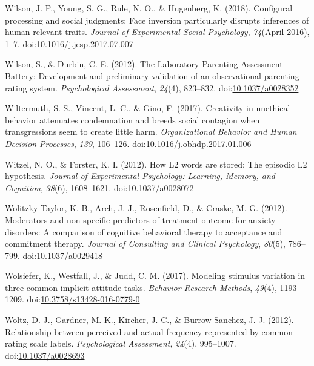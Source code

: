 \documentclass[english,man]{apa6}
\theoremstyle{definition}
\theoremstyle{definition}
\theoremstyle{definition}
\theoremstyle{remark}
\begin{document}
\hypertarget{ref-Wilson2018}{}
Wilson, J. P., Young, S. G., Rule, N. O., \& Hugenberg, K. (2018).
Configural processing and social judgments: Face inversion particularly
disrupts inferences of human-relevant traits. \emph{Journal of
Experimental Social Psychology}, \emph{74}(April 2016), 1--7.
doi:\href{https://doi.org/10.1016/j.jesp.2017.07.007}{10.1016/j.jesp.2017.07.007}

\hypertarget{ref-Wilson2012}{}
Wilson, S., \& Durbin, C. E. (2012). The Laboratory Parenting Assessment
Battery: Development and preliminary validation of an observational
parenting rating system. \emph{Psychological Assessment}, \emph{24}(4),
823--832. doi:\href{https://doi.org/10.1037/a0028352}{10.1037/a0028352}

\hypertarget{ref-Wiltermuth2017}{}
Wiltermuth, S. S., Vincent, L. C., \& Gino, F. (2017). Creativity in
unethical behavior attenuates condemnation and breeds social contagion
when transgressions seem to create little harm. \emph{Organizational
Behavior and Human Decision Processes}, \emph{139}, 106--126.
doi:\href{https://doi.org/10.1016/j.obhdp.2017.01.006}{10.1016/j.obhdp.2017.01.006}

\hypertarget{ref-Witzel2012}{}
Witzel, N. O., \& Forster, K. I. (2012). How L2 words are stored: The
episodic L2 hypothesis. \emph{Journal of Experimental Psychology:
Learning, Memory, and Cognition}, \emph{38}(6), 1608--1621.
doi:\href{https://doi.org/10.1037/a0028072}{10.1037/a0028072}

\hypertarget{ref-Wolitzky-Taylor2012}{}
Wolitzky-Taylor, K. B., Arch, J. J., Rosenfield, D., \& Craske, M. G.
(2012). Moderators and non-specific predictors of treatment outcome for
anxiety disorders: A comparison of cognitive behavioral therapy to
acceptance and commitment therapy. \emph{Journal of Consulting and
Clinical Psychology}, \emph{80}(5), 786--799.
doi:\href{https://doi.org/10.1037/a0029418}{10.1037/a0029418}

\hypertarget{ref-Wolsiefer2017}{}
Wolsiefer, K., Westfall, J., \& Judd, C. M. (2017). Modeling stimulus
variation in three common implicit attitude tasks. \emph{Behavior
Research Methods}, \emph{49}(4), 1193--1209.
doi:\href{https://doi.org/10.3758/s13428-016-0779-0}{10.3758/s13428-016-0779-0}

\hypertarget{ref-Woltz2012}{}
Woltz, D. J., Gardner, M. K., Kircher, J. C., \& Burrow-Sanchez, J. J.
(2012). Relationship between perceived and actual frequency represented
by common rating scale labels. \emph{Psychological Assessment},
\emph{24}(4), 995--1007.
doi:\href{https://doi.org/10.1037/a0028693}{10.1037/a0028693}
\end{document}

